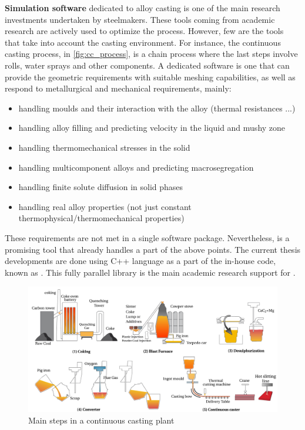 \textbf{Simulation software} dedicated to alloy casting is one of the main research investments undertaken by steelmakers. These tools coming from academic research
are actively used to optimize the process. However, few are the tools that take into account the casting environment. For instance, the continuous casting process, in
\autoref{fig:cc_process}, is a chain process where the last steps involve rolls, water sprays and other components. A dedicated software is one that can provide the
geometric requirements with suitable meshing capabilities, as well as respond to metallurgical and mechanical requirements, mainly:
\begin{itemize}
\item handling moulds and their interaction with the alloy (thermal resistances ...)
\item handling alloy filling and predicting velocity in the liquid and mushy zone
\item handling thermomechanical stresses in the solid
\item handling multicomponent alloys and predicting macrosegregation
\item handling finite solute diffusion in solid phases
\item handling real alloy properties (not just constant thermophysical/thermomechanical properties)
\end{itemize}

These requirements are not met in a single software package. Nevertheless, \thercast is a promising tool that already 
handles a part of the above points. The current thesis developments are done using C++ language as a part of the
in-house code, known as \cimlib \citep{digonnet_cimlib:_2007, mesri_advanced_2009}. 
This fully parallel library is the main academic research support for \thercast.

\begin{figure}
	\centering
	\includegraphics[width=\textwidth]{Chapter0/Graphics/cc_process}
\caption{Main steps in a continuous casting plant}

\label{fig:cc_process}
\end{figure}

